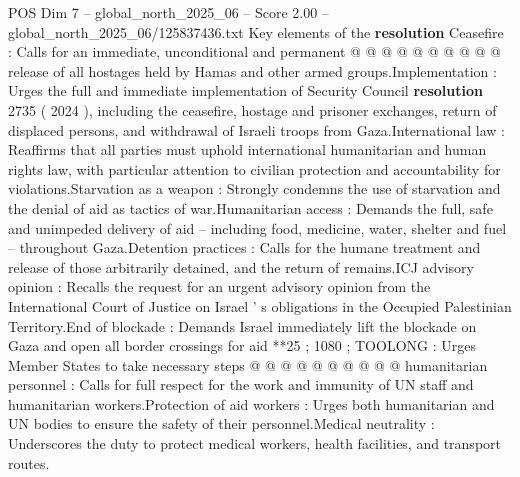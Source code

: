 \begin{textsample}{POS Dim 7 – global\_north\_2025\_06 – Score 2.00 – global\_north\_2025\_06/125837436.txt}
Key elements of the \textbf{resolution} Ceasefire : Calls for an immediate, unconditional and permanent @ @ @ @ @ @ @ @ @ @ release of all hostages held by Hamas and other armed groups.Implementation : Urges the full and immediate implementation of Security Council \textbf{resolution} 2735 ( 2024 ), including the ceasefire, hostage and prisoner exchanges, return of displaced persons, and withdrawal of Israeli troops from Gaza.International law : Reaffirms that all parties must uphold international humanitarian and human rights law, with particular attention to civilian protection and accountability for violations.Starvation as a weapon : Strongly condemns the use of starvation and the denial of aid as tactics of war.Humanitarian access : Demands the full, safe and unimpeded delivery of aid -- including food, medicine, water, shelter and fuel -- throughout Gaza.Detention practices : Calls for the humane treatment and release of those arbitrarily detained, and the return of remains.ICJ advisory opinion : Recalls the request for an urgent advisory opinion from the International Court of Justice on Israel ' s obligations in the Occupied Palestinian Territory.End of blockade : Demands Israel immediately lift the blockade on Gaza and open all border crossings for aid **25 ; 1080 ; TOOLONG : Urges Member States to take necessary steps @ @ @ @ @ @ @ @ @ @ humanitarian personnel : Calls for full respect for the work and immunity of UN staff and humanitarian workers.Protection of aid workers : Urges both humanitarian and UN bodies to ensure the safety of their personnel.Medical neutrality : Underscores the duty to protect medical workers, health facilities, and transport routes.

\end{textsample}
